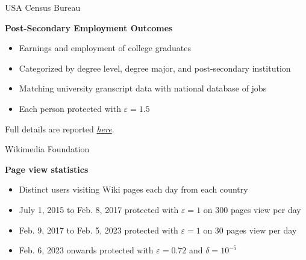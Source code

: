 \documentclass[12pt,aspectratio=169,handout]{beamer}
\begin{document}

\begin{frame}{USA Census Bureau}

\textbf{Post-Secondary Employment Outcomes} \vskip2mm

\begin{itemize} \setlength\itemsep{2mm}
%
\item Earnings and employment of college graduates
%
\item Categorized by degree level, degree major, and post-secondary institution
%
\item Matching university granscript data with national database of jobs
%
\item Each person protected with $\varepsilon = 1.5$
%
\end{itemize}

Full details are reported {\it \href{https://lehd.ces.census.gov/doc/PSEOTechnicalDocumentation.pdf}{here}}.

\end{frame}


\begin{frame}{Wikimedia Foundation}

\textbf{Page view statistics} \vskip2mm

\begin{itemize} \setlength\itemsep{2mm}
%
\item Distinct users visiting Wiki pages each day from each country
%
\item July 1, 2015 to Feb. 8, 2017 protected with $\varepsilon = 1$ on 300 pages view per day
%
\item Feb. 9, 2017 to Feb. 5, 2023 protected with $\varepsilon = 1$ on 30 pages view per day
%
\item Feb. 6, 2023 onwards protected with $\varepsilon = 0.72$ and $\delta = 10^{-5}$
%
\end{itemize}


\end{frame}

\end{document}
